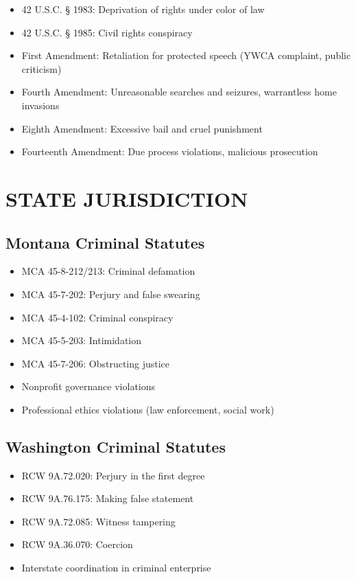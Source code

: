 \documentclass[12pt,oneside]{article}
\begin{document}
\begin{itemize}
\item 42 U.S.C. § 1983: Deprivation of rights under color of law
\item 42 U.S.C. § 1985: Civil rights conspiracy
\item First Amendment: Retaliation for protected speech (YWCA complaint, public criticism)
\item Fourth Amendment: Unreasonable searches and seizures, warrantless home invasions
\item Eighth Amendment: Excessive bail and cruel punishment
\item Fourteenth Amendment: Due process violations, malicious prosecution
\end{itemize}

\section*{STATE JURISDICTION}

\subsection*{Montana Criminal Statutes}

\begin{itemize}
\item MCA 45-8-212/213: Criminal defamation
\item MCA 45-7-202: Perjury and false swearing
\item MCA 45-4-102: Criminal conspiracy
\item MCA 45-5-203: Intimidation
\item MCA 45-7-206: Obstructing justice
\item Nonprofit governance violations
\item Professional ethics violations (law enforcement, social work)
\end{itemize}

\subsection*{Washington Criminal Statutes}

\begin{itemize}
\item RCW 9A.72.020: Perjury in the first degree
\item RCW 9A.76.175: Making false statement
\item RCW 9A.72.085: Witness tampering
\item RCW 9A.36.070: Coercion
\item Interstate coordination in criminal enterprise
\end{itemize}
\end{document}
